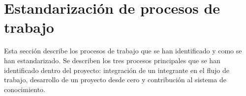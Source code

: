 \section{Estandarización de procesos de trabajo}
Esta sección describe los procesos de trabajo que se
han identificado y como se han estandarizado. Se describen
los tres procesos principales que se han identificado dentro
del proyecto: integración de un integrante en el flujo de trabajo,
desarrollo de un proyecto desde cero y contribución al sistema
de conocimiento.






\pagebreak
